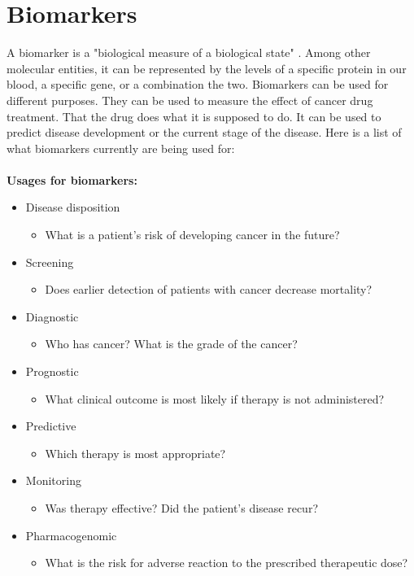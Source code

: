 \section{Biomarkers}
A biomarker is a "biological measure of a biological state"
\cite{biomarker1}. Among other molecular entities, it can be represented by the
levels of a specific protein in our blood, a specific gene, or a combination the
two.  Biomarkers can be used for different purposes. They can be used to measure
the effect of cancer drug treatment. That the drug does what it is supposed to
do.  It can be used to predict disease development or the current stage of the
disease. Here is a list of what biomarkers currently are being used for:
\\\\
\textbf{Usages for biomarkers:} \cite{beyondpsa}
\begin{itemize}
    \item Disease disposition
        \begin{itemize}
            \item What is a patient's risk of developing cancer in the future?
        \end{itemize}
    \item Screening
        \begin{itemize}
            \item Does earlier detection of patients with cancer decrease
                mortality?
        \end{itemize}
    \item Diagnostic
        \begin{itemize}
            \item Who has cancer? What is the grade of the cancer?
        \end{itemize}
    \item Prognostic
        \begin{itemize}
            \item What clinical outcome is most likely if therapy is not
                administered?
        \end{itemize}
    \item Predictive
        \begin{itemize}
            \item Which therapy is most appropriate?
        \end{itemize}
    \item Monitoring
        \begin{itemize}
            \item Was therapy effective? Did the patient's disease recur?
        \end{itemize}
    \item Pharmacogenomic
        \begin{itemize}
            \item What is the risk for adverse reaction to the prescribed
                therapeutic dose?
        \end{itemize}
\end{itemize}
